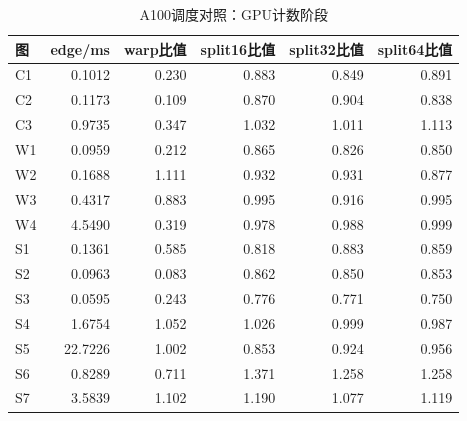 \begin{table}[htbp]
\centering
\small
\caption{A100调度对照：GPU计数阶段}\label{tab:a100_gpu}
\begin{tabular}{lrrrrr}
\toprule
图 & edge/ms & warp比值 & split16比值 & split32比值 & split64比值 \\
\midrule
C1 & 0.1012 & 0.230 & 0.883 & 0.849 & 0.891 \\
C2 & 0.1173 & 0.109 & 0.870 & 0.904 & 0.838 \\
C3 & 0.9735 & 0.347 & 1.032 & 1.011 & 1.113 \\
W1 & 0.0959 & 0.212 & 0.865 & 0.826 & 0.850 \\
W2 & 0.1688 & 1.111 & 0.932 & 0.931 & 0.877 \\
W3 & 0.4317 & 0.883 & 0.995 & 0.916 & 0.995 \\
W4 & 4.5490 & 0.319 & 0.978 & 0.988 & 0.999 \\
S1 & 0.1361 & 0.585 & 0.818 & 0.883 & 0.859 \\
S2 & 0.0963 & 0.083 & 0.862 & 0.850 & 0.853 \\
S3 & 0.0595 & 0.243 & 0.776 & 0.771 & 0.750 \\
S4 & 1.6754 & 1.052 & 1.026 & 0.999 & 0.987 \\
S5 & 22.7226 & 1.002 & 0.853 & 0.924 & 0.956 \\
S6 & 0.8289 & 0.711 & 1.371 & 1.258 & 1.258 \\
S7 & 3.5839 & 1.102 & 1.190 & 1.077 & 1.119 \\
\bottomrule
\end{tabular}
\par{}
\end{table}
